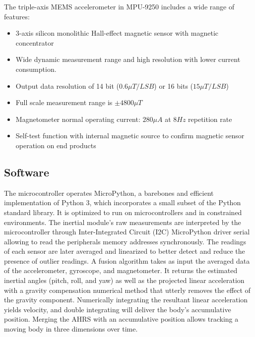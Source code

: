 The triple-axis MEMS accelerometer in MPU-9250 includes a wide range of features:
\begin{itemize}
  \item 3-axis silicon monolithic Hall-effect magnetic sensor with magnetic concentrator
  \item Wide dynamic measurement range and high resolution with lower current consumption.
  \item Output data resolution of 14 bit ($0.6 \mu T/LSB$) or 16 bits ($15 \mu T/LSB$)
  \item Full scale measurement range is $\pm 4800 \mu T$
  \item Magnetometer normal operating current: $280\mu A$ at $8 Hz$ repetition rate
  \item Self-test function with internal magnetic source to confirm magnetic sensor operation on end products
\end{itemize}

\begin{figure}[H]
  \centering
  
\end{figure}

\subsection{Software}
The microcontroller operates MicroPython, a barebones and efficient implementation of Python 3, which incorporates a small subset of the Python standard library. It is optimized to run on microcontrollers and in constrained environments. The inertial module's raw measurements are interpreted by the microcontroller through Inter-Integrated Circuit (I2C) MicroPython driver serial allowing to read the peripherals memory addresses synchronously. The readings of each sensor are later averaged and linearized to better detect and reduce the presence of outlier readings. A fusion algorithm takes as input the averaged data of the accelerometer, gyroscope, and magnetometer. It returns the estimated inertial angles (pitch, roll, and yaw) as well as the projected linear acceleration with a gravity compensation numerical method that utterly removes the effect of the gravity component. Numerically integrating the resultant linear acceleration yields velocity, and double integrating will deliver the body's accumulative position. Merging the AHRS with an accumulative position allows tracking a moving body in three dimensions over time.


